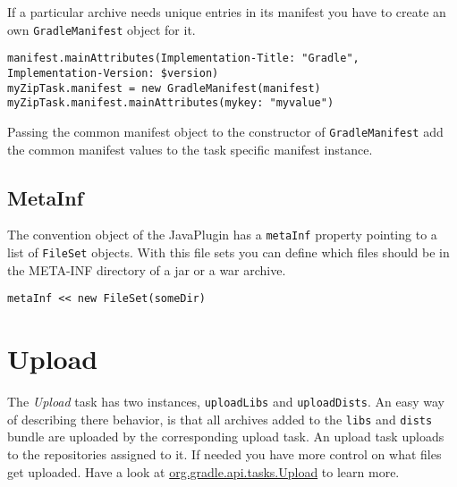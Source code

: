 If a particular archive needs unique entries in its manifest you have to create an own \texttt{GradleManifest} object for it.
\begin{Verbatim}
manifest.mainAttributes(Implementation-Title: "Gradle", Implementation-Version: $version)
myZipTask.manifest = new GradleManifest(manifest)
myZipTask.manifest.mainAttributes(mykey: "myvalue")
\end{Verbatim} 
Passing the common manifest object to the constructor of \texttt{GradleManifest} add the common manifest values to the task specific manifest instance.

\subsection{MetaInf} %
\label{sub:metainf}
The convention object of the JavaPlugin has a \texttt{metaInf} property pointing to a list of \texttt{FileSet} objects. With this file sets you can define which files should be in the META-INF directory of a jar or a war archive. 
\begin{Verbatim}
metaInf << new FileSet(someDir)
\end{Verbatim}

\section{Upload} %
\label{sec:upload}
The \emph{Upload} task has two instances, \texttt{uploadLibs} and \texttt{uploadDists}. An easy way of describing there behavior, is that all archives added to the \texttt{libs} and \texttt{dists} bundle are uploaded by the corresponding upload task. An upload task uploads to the repositories assigned to it. If needed you have more control on what files get uploaded. Have a look at \href{\API tasks/Upload.html}{org.gradle.api.tasks.Upload} to learn more.
